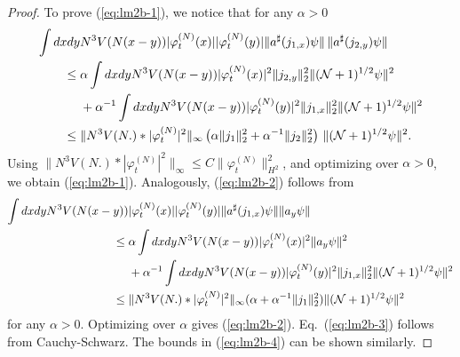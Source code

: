 \documentclass[11pt,a4paper]{article}
\newcommand{\cN}{{\cal N}}
\begin{document}
\begin{proof}
To prove (\ref{eq:lm2b-1}), we notice that for any $\alpha > 0$
\[ \begin{split} 
\int dx dy &N^3 V(N (x-y)) |\varphi_t^{(N)} (x)| |\varphi_t^{(N)} (y)|  \| a^\sharp (j_{1,x}) \psi \| \, \| a^\sharp (j_{2,y}) \psi \| \\ \leq \; & \alpha \int dx dy N^3 V(N (x-y)) |\varphi^{(N)}_t (x)|^2 \| j_{2,y} \|_2^2 \| (\cN+1)^{1/2} \psi \|^2 \\ &+ \alpha^{-1}
 \int dx dy N^3 V(N (x-y)) |\varphi^{(N)}_t (y)|^2 \| j_{1,x} \|_2^2 \| (\cN+1)^{1/2} \psi \|^2 \\
 \leq \; & \| N^3 V(N.) * |\varphi_t^{(N)}|^2 \|_\infty  \left( \alpha \| j_{1} \|^2_2 + \alpha^{-1}
 \| j_2 \|_{2}^2 \right) \, \| (\cN+1)^{1/2} \psi \|^2.
 \end{split} \]
 Using $\| N^3 V(N.) * |\varphi_t^{(N)}|^2 \|_\infty \leq C \| \varphi_t^{(N)} \|_{H^2}^2$, and optimizing over $\alpha >0$, we obtain (\ref{eq:lm2b-1}). Analogously, (\ref{eq:lm2b-2}) follows from
\[ \begin{split} 
\int dx dy N^3 V(N (x-y)) &|\varphi^{(N)}_t (x)| |\varphi^{(N)}_t (y)| \| a^\sharp (j_{1,x}) \psi \| \| a_y \psi \| \\ 
\leq \; & \alpha \int dx dy N^3 V(N (x-y)) |\varphi^{(N)}_t (x)|^2 \| a_y \psi \|^2  \\ &+ \alpha^{-1}
 \int dx dy N^3 V(N (x-y)) |\varphi^{(N)}_t (y)|^2 \| j_{1,x} \|_2^2 \| (\cN+1)^{1/2} \psi \|^2 \\
 \leq \; & \| N^3 V(N.) * |\varphi_t^{(N)}|^2 \|_\infty (\alpha + \alpha^{-1} \| j_1\|_{2}^2) \| (\cN+1)^{1/2} \psi \|^2
 \end{split} \]
for any $\alpha > 0$. Optimizing over $\alpha$ gives (\ref{eq:lm2b-2}). Eq.\ (\ref{eq:lm2b-3}) follows from Cauchy-Schwarz. The bounds in (\ref{eq:lm2b-4}) can be shown similarly.

\end{proof}
\end{document}
